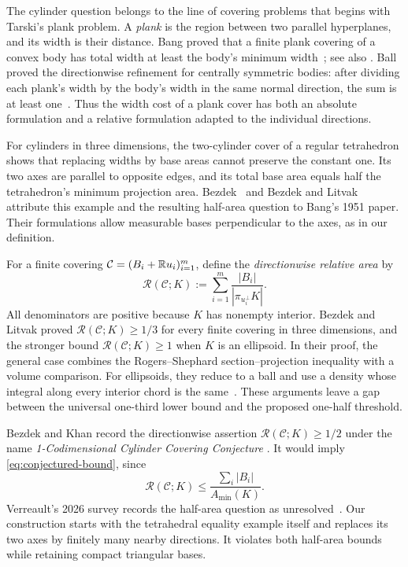 The cylinder question belongs to the line of covering problems that begins
with Tarski's plank problem. A \emph{plank} is the region between two
parallel hyperplanes, and its width is their distance. Bang proved that
a finite plank covering of a convex body has total width at least the
body's minimum width~\cite{Bang1951}; see also
\cite[Theorem~2.1]{Bezdek2009}.
Ball proved the directionwise refinement for centrally symmetric bodies:
after dividing each plank's width by the body's width in the same normal
direction, the sum is at least one~\cite[arXiv v1, Theorem~1]{Ball1991}.
Thus the width cost of a plank cover has both an absolute formulation
and a relative formulation adapted to the individual directions.

For cylinders in three dimensions, the two-cylinder cover of a regular
tetrahedron shows that replacing widths by base areas cannot preserve
the constant one. Its two axes are parallel to opposite edges, and its
total base area equals half the tetrahedron's minimum projection area.
Bezdek~\cite[Problem~3.1]{Bezdek2009} and
Bezdek and Litvak~\cite[arXiv v1, Introduction]{BL2009} attribute this example and
the resulting half-area question to Bang's 1951 paper. Their formulations
allow measurable bases perpendicular to the axes, as in our definition.

For a finite covering $\mathcal C=(B_i+\mathbb R u_i)_{i=1}^m$, define the
\emph{directionwise relative area} by
\begin{equation}\label{eq:relative-cost}
 \mathcal R(\mathcal C;K):=
 \sum_{i=1}^m\frac{|B_i|}{|\pi_{u_i^\perp}K|}.
\end{equation}
All denominators are positive because $K$ has nonempty interior.
Bezdek and Litvak proved $\mathcal R(\mathcal C;K)\ge1/3$
for every finite covering in three dimensions, and the stronger bound
$\mathcal R(\mathcal C;K)\ge1$ when $K$ is an
ellipsoid. In their proof, the general case combines the Rogers--Shephard
section--projection inequality with a volume comparison. For ellipsoids,
they reduce to a ball and use a density whose integral along every
interior chord is the same~\cite[arXiv v1, Theorem~3.1 and its proof]{BL2009}.
These arguments leave
a gap between the universal one-third lower bound and the proposed
one-half threshold.

Bezdek and Khan record the directionwise assertion
$\mathcal R(\mathcal C;K)\ge1/2$ under the name
\emph{1-Codimensional Cylinder Covering Conjecture}
\cite[arXiv v2, Definition~3 and Conjecture~4.13]{BK2016}.
It would imply \eqref{eq:conjectured-bound}, since
\begin{equation}\label{eq:cost-comparison}
 \mathcal R(\mathcal C;K)
 \le \frac{\sum_i|B_i|}{A_{\min}(K)}.
\end{equation}
Verreault's 2026 survey records the half-area question as
unresolved~\cite[Question~4.14]{Verreault2026}.
Our construction starts with the tetrahedral equality example itself
and replaces its two axes by finitely many nearby directions. It
violates both half-area bounds while retaining compact triangular bases.
